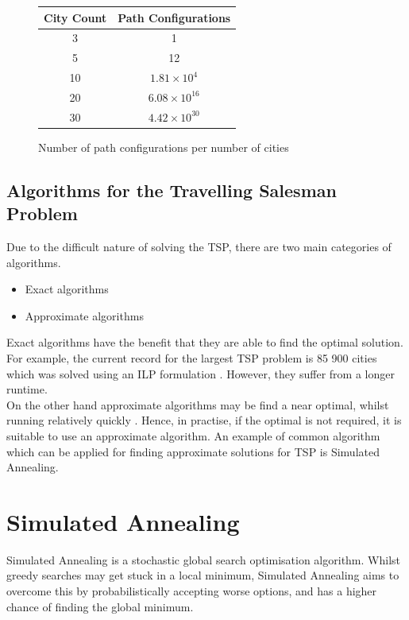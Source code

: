\documentclass{article}
\begin{document}
\begin{figure}[h]
    \centering
    \begin{tabular}{ |c|c| } 
        \hline
        City Count & Path Configurations \\ 
        \hline
        3 & 1 \\
        \hline
        5 & 12 \\
        \hline
        10 & $1.81 \times 10^{4}$ \\ 
        \hline
        20 & $6.08 \times 10^{16}$ \\
        \hline
        30 & $4.42 \times 10^{30}$ \\
        \hline
    \end{tabular}
    \caption{Number of path configurations per number of cities}
\end{figure}

\subsection{Algorithms for the Travelling Salesman Problem}

Due to the difficult nature of solving the TSP, there are two main categories of algorithms.

\begin{itemize}
    \item Exact algorithms
    \item Approximate algorithms
\end{itemize}

Exact algorithms have the benefit that they are able to find the optimal solution.
For example, the current record for the largest TSP problem is 85 900 cities which was solved using an ILP formulation \cite{cook12}.
However, they suffer from a longer runtime. \\

On the other hand approximate algorithms may be find a near optimal, whilst running relatively quickly \cite{helsgaun98}.
Hence, in practise, if the optimal is not required, it is suitable to use an approximate algorithm.
An example of common algorithm which can be applied for finding approximate solutions for TSP is Simulated Annealing.

\newpage
\section{Simulated Annealing}
Simulated Annealing is a stochastic global search optimisation algorithm.
Whilst greedy searches may get stuck in a local minimum, Simulated Annealing aims to overcome this by probabilistically accepting worse options, and has a higher chance of finding the global minimum.
\\
\end{document}

